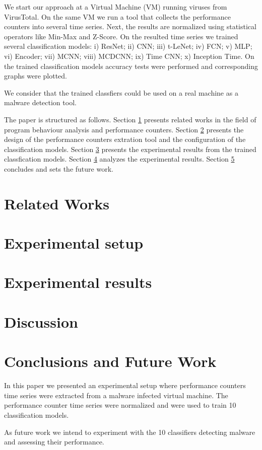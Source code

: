 \documentclass[conference]{IEEEtran}
\begin{document}
We start our approach at a Virtual Machine (VM) running viruses from VirusTotal.
On the same VM we run a tool that collects the performance counters into several time series.
Next, the results are normalized using statistical operators like Min-Max and Z-Score.
On the resulted time series we trained several classification models:
i) ResNet;
ii) CNN;
iii) t-LeNet;
iv) FCN;
v) MLP;
vi) Encoder;
vii) MCNN;
viii) MCDCNN;
ix) Time CNN;
x) Inception Time.
On the trained classification models accuracy tests were performed and corresponding graphs were plotted.

We consider that the trained classfiers could be used on a real machine as a malware detection tool.

The paper is structured as follows.
Section \ref{sec:related-works} presents related works in the field of program behaviour analysis and performance counters.
Section \ref{sec:experimental-setup} presents the design of the performance counters extration tool and the configuration of the classification models.
Section \ref{sec:experimental-results} presents the experimental results from the trained classfication models.
Section \ref{sec:discussion} analyzes the experimental results. 
Section \ref{sec:conclusions-and-future-work} concludes and sets the future work.

\section{Related Works}
\label{sec:related-works}


\section{Experimental setup}
\label{sec:experimental-setup}


\section{Experimental results}
\label{sec:experimental-results}


\section{Discussion}
\label{sec:discussion}


\section{Conclusions and Future Work}
\label{sec:conclusions-and-future-work}
In this paper we presented an experimental setup where performance counters time series were extracted from a malware infected virtual machine.
The performance counter time series were normalized and were used to train 10 classification models.

As future work we intend to experiment with the 10 classifiers detecting malware and assessing their performance.


\balance

\end{document}
